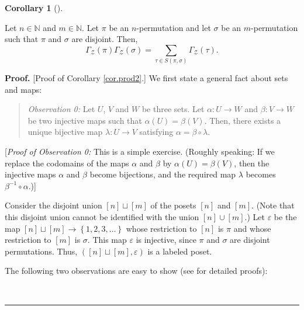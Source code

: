 \documentclass[numbers=enddot,12pt,final,onecolumn,notitlepage]{scrartcl}%
\theoremstyle{definition}
\newtheorem{coro}[theo]{Corollary}
\newenvironment{corollary}[1][]
{\begin{coro}[#1]\begin{leftbar}}
{\end{leftbar}\end{coro}}
\newenvironment{statement}{\begin{quote}}{\end{quote}}
\newenvironment{proof}[1][Proof]{\noindent\textbf{#1.} }{\ \rule{0.5em}{0.5em}}
\newenvironment{verlong}{}{}
\newenvironment{vershort}{}{}
\let\sumnonlimits\sum
\renewcommand{\sum}{\sumnonlimits\limits}
\begin{document}
\begin{corollary}
\label{cor.prod2}Let $n\in\mathbb{N}$ and $m\in\mathbb{N}$. Let $\pi$ be an
$n$-permutation and let $\sigma$ be an $m$-permutation such that $\pi$ and
$\sigma$ are disjoint. Then,%
\[
\Gamma_{\mathcal{Z}}\left(  \pi\right)  \Gamma_{\mathcal{Z}}\left(
\sigma\right)  =\sum_{\tau\in S\left(  \pi,\sigma\right)  }\Gamma
_{\mathcal{Z}}\left(  \tau\right)  .
\]

\end{corollary}

\begin{proof}
[Proof of Corollary \ref{cor.prod2}.]
\begin{verlong}
We first state a general fact about sets and maps:

\begin{statement}
\textit{Observation 0:} Let $U$, $V$ and $W$ be three sets. Let $\alpha
:U\rightarrow W$ and $\beta:V\rightarrow W$ be two injective maps such that
$\alpha\left(  U\right)  =\beta\left(  V\right)  $. Then, there exists a
unique bijective map $\lambda:U\rightarrow V$ satisfying $\alpha=\beta
\circ\lambda$.
\end{statement}

[\textit{Proof of Observation 0:} This is a simple exercise. (Roughly
speaking: If we replace the codomains of the maps $\alpha$ and $\beta$ by
$\alpha\left(  U\right)  =\beta\left(  V\right)  $, then the injective maps
$\alpha$ and $\beta$ become bijections, and the required map $\lambda$ becomes
$\beta^{-1}\circ\alpha$.)]

\end{verlong}
%
Consider the disjoint union $\left[  n\right]  \sqcup\left[  m\right]  $ of
the posets $\left[  n\right]  $ and $\left[  m\right]  $. (Note that this
disjoint union cannot be identified with the union $\left[  n\right]
\cup\left[  m\right]  $.) Let $\varepsilon$ be the map $\left[  n\right]
\sqcup\left[  m\right]  \rightarrow\left\{  1,2,3,\ldots\right\}  $ whose
restriction to $\left[  n\right]  $ is $\pi$ and whose restriction to $\left[
m\right]  $ is $\sigma$. This map $\varepsilon$ is injective, since $\pi$ and
$\sigma$ are disjoint permutations. Thus, $\left(  \left[  n\right]
\sqcup\left[  m\right]  ,\varepsilon\right)  $ is a labeled poset.

\begin{vershort}
The following two observations are easy to show (see \cite{verlong}
for detailed proofs):
\end{vershort}


\end{proof}
\end{document}
